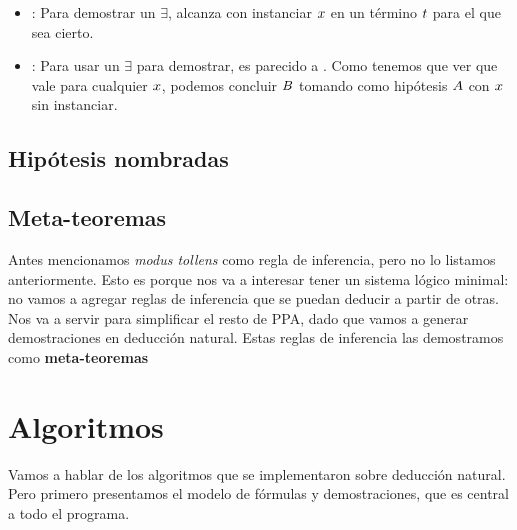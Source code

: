 \proofTreeExistsI
\proofTreeExistsE

\begin{itemize}
    \item {}: Para demostrar un $\exists$, alcanza con instanciar $x$ en un término $t$ para el que sea cierto.
    \item {}: Para usar un $\exists$ para demostrar, es parecido a . Como tenemos que ver que vale para cualquier $x$, podemos concluir $B$ tomando como hipótesis $A$ con $x$ sin instanciar. 
\end{itemize}

\begin{ejemplo}\label{nd:ex:exam-nd-quantifiers}
\end{ejemplo}

\subsection{Hipótesis nombradas}


\subsection{Meta-teoremas}

Antes mencionamos \textit{modus tollens} como regla de inferencia, pero no lo
listamos anteriormente. Esto es porque nos va a interesar tener un sistema
lógico minimal: no vamos a agregar reglas de inferencia que se puedan deducir a
partir de otras. Nos va a servir para simplificar el resto de PPA, dado que
vamos a generar demostraciones en deducción natural. Estas reglas de inferencia
las demostramos como \textbf{meta-teoremas}




\section{Algoritmos}

Vamos a hablar de los algoritmos que se implementaron sobre deducción natural.
Pero primero presentamos el modelo de fórmulas y demostraciones, que es central a todo el programa.

